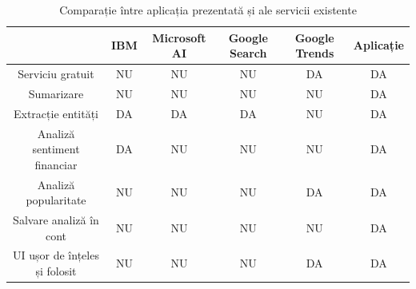 \begin{table}[H]
	\caption{Comparație între aplicația prezentată și ale servicii existente}
	\centering                          %
	\begin{tabular}{|c|c|c|c|c|c|}          %
		\hline
		 & IBM & Microsoft AI & Google Search & Google Trends & Aplicație\\ [2ex]   %
		\hline                              %
		Serviciu gratuit & NU & NU & NU & DA & DA \\[2ex]               %
		Sumarizare & NU & NU & NU & NU & DA \\ [2ex]
        Extracție entități & DA & DA & DA & NU & DA \\ [2ex]
        Analiză sentiment financiar & DA & NU & NU & NU & DA \\[2ex]
        Analiză popularitate & NU & NU & NU & DA & DA \\[2ex]
		Salvare analiză în cont & NU & NU & NU & NU & DA \\[2ex]           %
        UI ușor de înțeles și folosit & NU & NU & NU & DA & DA \\[2ex] 
        \hline                              
	\end{tabular}
	\label{tab:nonlin}                %
\end{table}